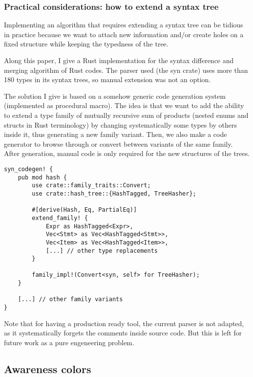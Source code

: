 \documentclass[a4paper,11pt]{article}
\begin{document}
\subsubsection{Practical considerations: how to extend a syntax tree}
Implementing an algorithm that requires extending a syntax tree can be tidious in practice because we want to attach new information and/or create holes on a fixed structure while keeping the typedness of the tree.

Along this paper, I give a Rust implementation for the syntax difference and merging algorithm of Rust codes. The parser used (the syn crate) uses more than 180 types in its syntax trees, so manual extension was not an option.

The solution I give is based on a somehow generic code generation system (implemented as procedural macro). The idea is that we want to add the ability to extend a type family of mutually recursive sum of products (nested enums and structs in Rust terminology) by changing systematically some types by others inside it, thus generating a new family variant. Then, we also make a code generator to browse through or convert between variants of the same family. After generation, manual code is only required for the new structures of the trees.

\begin{lstlisting}[label=lst:codegen, caption={Usage example of the code generator for creating the hash-tagged family variant}]
syn_codegen! {
    pub mod hash {
        use crate::family_traits::Convert;
        use crate::hash_tree::{HashTagged, TreeHasher};

        #[derive(Hash, Eq, PartialEq)]
        extend_family! {
            Expr as HashTagged<Expr>,
            Vec<Stmt> as Vec<HashTagged<Stmt>>,
            Vec<Item> as Vec<HashTagged<Item>>,
            [...] // other type replacements
        }

        family_impl!(Convert<syn, self> for TreeHasher);
    }

    [...] // other family variants
}
\end{lstlisting}


Note that for having a production ready tool, the current parser is not adapted, as it systematically forgets the comments inside source code. But this is left for future work as a pure engeneering problem.

\subsection{Awareness colors}
\end{document}
